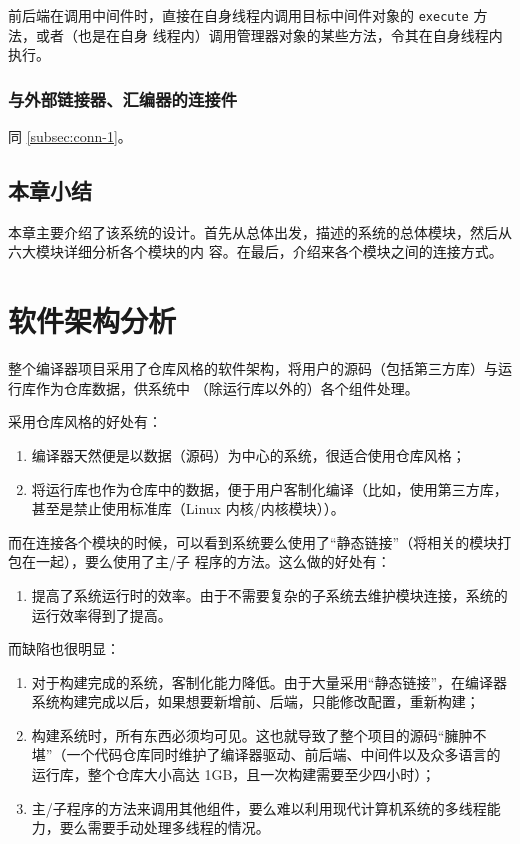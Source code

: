 \documentclass[12pt]{ctexrep}
\begin{document}
    前后端在调用中间件时，直接在自身线程内调用目标中间件对象的 \verb|execute| 方法，或者（也是在自身
    线程内）调用管理器对象的某些方法，令其在自身线程内执行。

    \subsection{与外部链接器、汇编器的连接件}

    同 \ref{subsec:conn-1}。

    \section{本章小结}

    本章主要介绍了该系统的设计。首先从总体出发，描述的系统的总体模块，然后从六大模块详细分析各个模块的内
    容。在最后，介绍来各个模块之间的连接方式。

    \chapter{软件架构分析}

    整个编译器项目采用了仓库风格的软件架构，将用户的源码（包括第三方库）与运行库作为仓库数据，供系统中
    （除运行库以外的）各个组件处理。

    采用仓库风格的好处有：

    \begin{enumerate}
        \item 编译器天然便是以数据（源码）为中心的系统，很适合使用仓库风格；
        \item 将运行库也作为仓库中的数据，便于用户客制化编译（比如，使用第三方库，甚至是禁止使用标准库（Linux 内核/内核模块））。
    \end{enumerate}

    而在连接各个模块的时候，可以看到系统要么使用了``静态链接''（将相关的模块打包在一起），要么使用了主/子
    程序的方法。这么做的好处有：

    \begin{enumerate}
        \item 提高了系统运行时的效率。由于不需要复杂的子系统去维护模块连接，系统的运行效率得到了提高。
    \end{enumerate}

    而缺陷也很明显：

    \begin{enumerate}
        \item 对于构建完成的系统，客制化能力降低。由于大量采用``静态链接''，在编译器系统构建完成以后，如果想要新增前、后端，只能修改配置，重新构建；
        \item 构建系统时，所有东西必须均可见。这也就导致了整个项目的源码``臃肿不堪''（一个代码仓库同时维护了编译器驱动、前后端、中间件以及众多语言的运行库，整个仓库大小高达 1GB，且一次构建需要至少四小时）；
        \item 主/子程序的方法来调用其他组件，要么难以利用现代计算机系统的多线程能力，要么需要手动处理多线程的情况。
    \end{enumerate}
\end{document}
